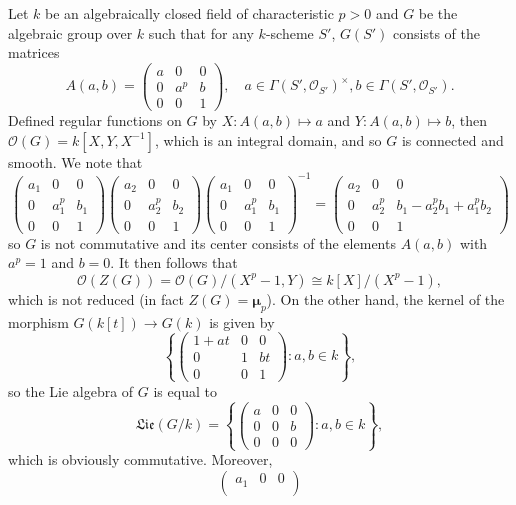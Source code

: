 \begin{example}
Let $k$ be an algebraically closed field of characteristic $p>0$ and $G$ be the algebraic group over $k$ such that for any $k$-scheme $S'$, $G(S')$ consists of the matrices
\[A(a,b)=\begin{pmatrix}
a&0&0\\
0&a^p&b\\
0&0&1
\end{pmatrix},\quad a\in\Gamma(S',\mathscr{O}_{S'})^\times,b\in\Gamma(S',\mathscr{O}_{S'}).\]
Defined regular functions on $G$ by $X:A(a,b)\mapsto a$ and $Y:A(a,b)\mapsto b$, then $\mathscr{O}(G)=k[X,Y,X^{-1}]$, which is an integral domain, and so $G$ is connected and smooth. We note that
\[\begin{pmatrix}
a_1&0&0\\
0&a_1^p&b_1\\
0&0&1
\end{pmatrix}\begin{pmatrix}
a_2&0&0\\
0&a_2^p&b_2\\
0&0&1
\end{pmatrix}\begin{pmatrix}
a_1&0&0\\
0&a_1^p&b_1\\
0&0&1
\end{pmatrix}^{-1}=\begin{pmatrix}
a_2&0&0\\
0&a_2^p&b_1-a_2^pb_1+a_1^pb_2\\
0&0&1
\end{pmatrix}\]
so $G$ is not commutative and its center consists of the elements $A(a,b)$ with $a^p=1$ and $b=0$. It then follows that
\[\mathscr{O}(Z(G))=\mathscr{O}(G)/(X^p-1,Y)\cong k[X]/(X^p-1),\]
which is not reduced (in fact $Z(G)=\bm{\mu}_p$). On the other hand, the kernel of the morphism $G(k[t])\to G(k)$ is given by
\[\left\{\begin{pmatrix}
1+at&0&0\\
0&1&bt\\
0&0&1
\end{pmatrix}:a,b\in k\right\},\]
so the Lie algebra of $G$ is equal to
\[\mathfrak{Lie}(G/k)=\left\{\begin{pmatrix}
a&0&0\\
0&0&b\\
0&0&0
\end{pmatrix}:a,b\in k\right\},\]
which is obviously commutative. Moreover,
\[\begin{pmatrix}
a_1&0&0\\

\end{pmatrix}\]
\end{example}
